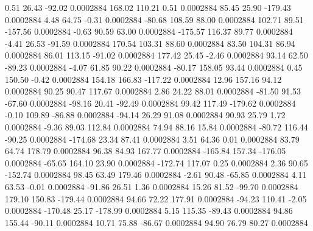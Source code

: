         0.51       26.43      -92.02     0.0002884
      168.02      110.21        0.51     0.0002884
       85.45       25.90     -179.43     0.0002884
        4.48       64.75       -0.31     0.0002884
      -80.68      108.59       88.00     0.0002884
      102.71       89.51     -157.56     0.0002884
       -0.63       90.59       63.00     0.0002884
     -175.57      116.37       89.77     0.0002884
       -4.41       26.53      -91.59     0.0002884
      170.54      103.31       88.60     0.0002884
       83.50      104.31       86.94     0.0002884
       86.01      113.15      -91.02     0.0002884
      177.42       25.45       -2.46     0.0002884
       93.14       62.50      -89.23     0.0002884
       -4.07       61.85       90.22     0.0002884
      -80.17      158.05       93.44     0.0002884
        0.45      150.50       -0.42     0.0002884
      154.18      166.83     -117.22     0.0002884
       12.96      157.16       94.12     0.0002884
       90.25       90.47      117.67     0.0002884
        2.86       24.22       88.01     0.0002884
      -81.50       91.53      -67.60     0.0002884
      -98.16       20.41      -92.49     0.0002884
       99.42      117.49     -179.62     0.0002884
       -0.10      109.89      -86.88     0.0002884
      -94.14       26.29       91.08     0.0002884
       90.93       25.79        1.72     0.0002884
       -9.36       89.03      112.84     0.0002884
       74.94       88.16       15.84     0.0002884
      -80.72      116.44      -90.25     0.0002884
     -174.68       23.34       87.41     0.0002884
        3.51       64.36        0.01     0.0002884
       83.79       64.74      178.79     0.0002884
       96.38       84.93      167.77     0.0002884
     -165.84      157.34     -176.05     0.0002884
      -65.65      164.10       23.90     0.0002884
     -172.74      117.07        0.25     0.0002884
        2.36       90.65     -152.74     0.0002884
       98.45       63.49      179.46     0.0002884
       -2.61       90.48      -65.85     0.0002884
        4.11       63.53       -0.01     0.0002884
      -91.86       26.51        1.36     0.0002884
       15.26       81.52      -99.70     0.0002884
      179.10      150.83     -179.44     0.0002884
       94.66       72.22      177.91     0.0002884
      -94.23      110.41       -2.05     0.0002884
     -170.48       25.17     -178.99     0.0002884
        5.15      115.35      -89.43     0.0002884
       94.86      155.44      -90.11     0.0002884
       10.71       75.88      -86.67     0.0002884
       94.90       76.79       80.27     0.0002884
